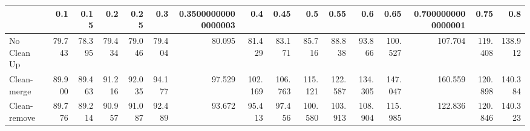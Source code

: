 \begin{tabular}{lrrrrrrrrrrrrrrr}
\toprule
{} &    0.1 &   0.15 &    0.2 &   0.25 &    0.3 & 0.35000000000000003 &     0.4 &    0.45 &     0.5 &    0.55 &     0.6 &    0.65 & 0.7000000000000001 &    0.75 &     0.8 \\
\midrule
No Clean Up  & 79.743 & 78.395 & 79.434 & 79.046 & 79.404 &              80.095 &  81.429 &  83.171 &  85.716 &  88.838 &  93.866 & 100.527 &            107.704 & 119.408 & 138.912 \\
Clean-merge  & 89.900 & 89.463 & 91.216 & 92.035 & 94.177 &              97.529 & 102.169 & 106.763 & 115.121 & 122.587 & 134.305 & 147.047 &            160.559 & 120.898 & 140.384 \\
Clean-remove & 89.776 & 89.214 & 90.957 & 91.087 & 92.489 &              93.672 &  95.413 &  97.456 & 100.580 & 103.913 & 108.904 & 115.985 &            122.836 & 120.846 & 140.323 \\
\bottomrule
\end{tabular}
